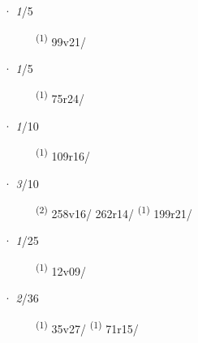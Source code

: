 \ENTRYEND
\noindent{} · \textit{1}/5 \LEMMALINE
\begin{description}
    \item[]  \textsuperscript{(1)} \mbox{99v21/}
\end{description}
\ENTRYEND
\noindent{} · \textit{1}/5 \LEMMALINE
\begin{description}
    \item[]  \textsuperscript{(1)} \mbox{75r24/}
\end{description}
\ENTRYEND
\noindent{} · \textit{1}/10 \LEMMALINE
\begin{description}
    \item[]  \textsuperscript{(1)} \mbox{109r16/}
\end{description}
\ENTRYEND
\noindent{} · \textit{3}/10 \LEMMALINE
\begin{description}
    \item[]  \textsuperscript{(2)} \mbox{258v16/} \mbox{262r14/} \CASEBREAK {} \textsuperscript{(1)} \mbox{199r21/}
\end{description}
\ENTRYEND
\noindent{} · \textit{1}/25 \LEMMALINE
\begin{description}
    \item[]  \textsuperscript{(1)} \mbox{12v09/}
\end{description}
\ENTRYEND
\noindent{} · \textit{2}/36 \LEMMALINE
\begin{description}
    \item[]  \textsuperscript{(1)} \mbox{35v27/} \textsuperscript{(1)} \mbox{71r15/}
\end{description}
